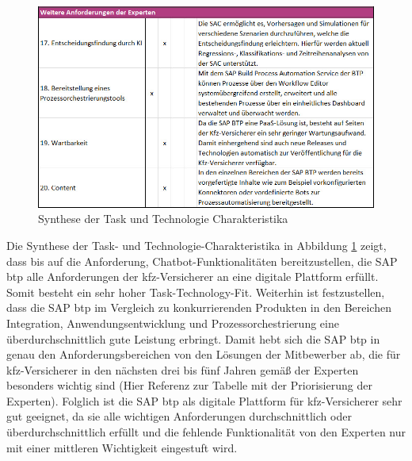 \begin{figure}[ht]
    \centering
    \includegraphics[width=1\textwidth]{img/TTFTeil3E.jpg}
    \caption[Synthese der Task und Technologie Charakteristika ]{Synthese der Task und Technologie Charakteristika \autocite{TTFTeil3}}
    \label{fig:TTFTeil3}
\end{figure}



\FloatBarrier



Die Synthese der Task- und Technologie-Charakteristika in Abbildung \ref{fig:TTFTeil3} zeigt, dass bis auf die Anforderung, Chatbot-Funktionalitäten bereitzustellen, die SAP \ac{btp} alle Anforderungen der \ac{kfz}-Versicherer an eine digitale Plattform erfüllt. Somit besteht ein sehr hoher Task-Technology-Fit. Weiterhin ist festzustellen, dass die SAP \ac{btp} im Vergleich zu konkurrierenden Produkten in den Bereichen Integration, Anwendungsentwicklung und Prozessorchestrierung eine überdurchschnittlich gute Leistung erbringt. Damit hebt sich die SAP \ac{btp} in genau den Anforderungsbereichen von den Lösungen der Mitbewerber ab, die für \ac{kfz}-Versicherer in den nächsten drei bis fünf Jahren gemäß der Experten besonders wichtig sind (Hier Referenz zur Tabelle mit der Priorisierung der Experten). Folglich ist die SAP \ac{btp} als digitale Plattform für \ac{kfz}-Versicherer sehr gut geeignet, da sie alle wichtigen Anforderungen durchschnittlich oder überdurchschnittlich erfüllt und die fehlende Funktionalität von den Experten nur mit einer mittleren Wichtigkeit eingestuft wird. 

